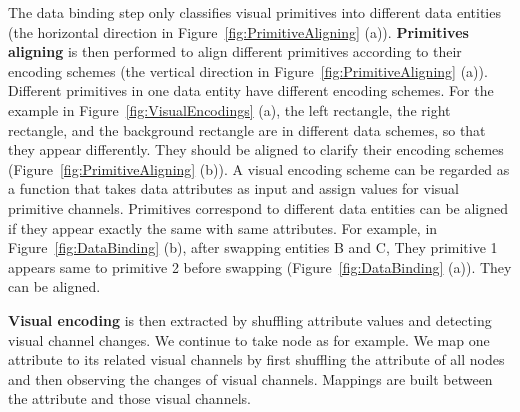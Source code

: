 The data binding step only classifies visual primitives into different data entities (the horizontal direction in Figure~\ref{fig:PrimitiveAligning} (a)).
\textbf{Primitives aligning} is then performed to align different primitives according to their encoding schemes (the vertical direction in Figure~\ref{fig:PrimitiveAligning} (a)).
Different primitives in one data entity have different encoding schemes.
For the example in Figure~\ref{fig:VisualEncodings} (a), the left rectangle, the right rectangle, and the background rectangle are in different data schemes, so that they appear differently.
They should be aligned to clarify their encoding schemes (Figure~\ref{fig:PrimitiveAligning} (b)).
A visual encoding scheme can be regarded as a function that takes data attributes as input and assign values for visual primitive channels.
Primitives correspond to different data entities can be aligned if they appear exactly the same with same attributes.
For example, in Figure~\ref{fig:DataBinding} (b), after swapping entities B and C, They primitive 1 appears same to primitive 2 before swapping (Figure~\ref{fig:DataBinding} (a)). They can be aligned.


\textbf{Visual encoding} is then extracted by shuffling attribute values and detecting visual channel changes.
We continue to take node as for example.
We map one attribute to its related visual channels by first shuffling the attribute of all nodes and then observing the changes of visual channels.
Mappings are built between the attribute and those visual channels.


